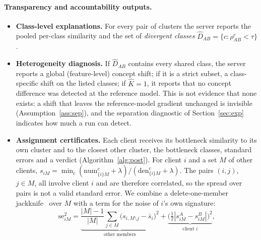 \documentclass[11pt]{article}
\theoremstyle{definition}
\theoremstyle{remark}
\begin{document}
\paragraph{Transparency and accountability outputs.}\label{sec:outputs}
\begin{itemize}[leftmargin=*,itemsep=1pt]
\item \textbf{Class-level explanations.} For every pair of clusters the server reports the pooled per-class similarity and the set of \emph{divergent classes} $\hat D_{AB}=\{c:\rho^c_{AB}<\tau\}$.
\item \textbf{Heterogeneity diagnosis.} If $\hat D_{AB}$ contains every shared class, the server reports a global (feature-level) concept shift; if it is a strict subset, a class-specific shift on the listed classes; if $\hat K=1$, it reports that no concept difference was detected at the reference model. This is not evidence that none exists: a shift that leaves the reference-model gradient unchanged is invisible (Assumption~\ref{ass:sep}), and the separation diagnostic of Section~\ref{sec:exp} indicates how much a run can detect.
\item \textbf{Assignment certificates.} Each client receives its bottleneck similarity to its own cluster and to the closest other cluster, the bottleneck classes, standard errors and a verdict (Algorithm~\ref{alg:post}). For client $i$ and a set $M$ of other clients, $s_{iM}=\min_c(\mathrm{num}^c_{\{i\}M}+\lambda)/(\mathrm{den}^c_{\{i\}M}+\lambda)$. The pairs $(i,j)$, $j\in M$, all involve client $i$ and are therefore correlated, so the spread over pairs is not a valid standard error. We combine a delete-one-member jackknife~\citep{efron1982jackknife} over $M$ with a term for the noise of $i$'s own signature:
\begin{equation}\label{eq:cert}
\mathrm{se}_{iM}^2=\underbrace{\frac{|M|-1}{|M|}\sum_{j\in M}\big(s_{i,M\setminus j}-\bar s_{i}\big)^2}_{\text{other members}}+\underbrace{\big(\tfrac12|s^{A}_{iM}-s^{B}_{iM}|\big)^2}_{\text{client }i},
\end{equation}

\end{itemize}
\end{document}
